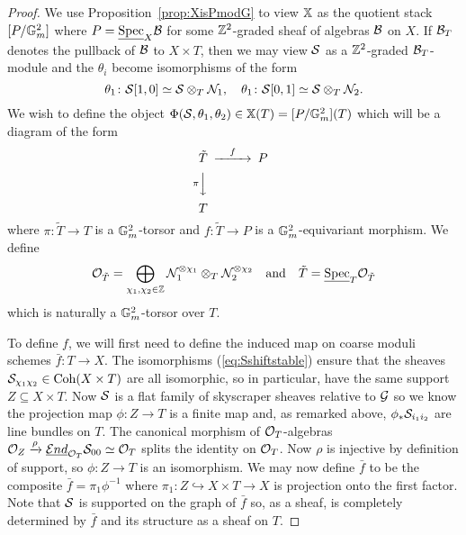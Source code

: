 \documentclass[12pt]{amsart}
\begin{document}
\begin{proof}
We use Proposition~\ref{prop:XisPmodG} to view $\mathbb{X}$ as the quotient stack $[P/\mathbb{G}_m^2]$ where $P = \underline{\operatorname{Spec}}_X \mathcal{B}$ for some $\mathbb{Z}^2$-graded sheaf of algebras $\mathcal{B}$ on $X$. 
If $\mathcal{B}_T$ denotes the pullback of $\mathcal{B}$ to $X \times T$, then we may view $\mathcal{S}$ as a $\mathbb{Z}^2$-graded $\mathcal{B}_T$-module and the $\theta_i$ become isomorphisms of the form 
\begin{equation}
\theta_1 \colon \mathcal{S}[1,0] \simeq \mathcal{S} \otimes_T \mathcal{N}_1, \quad 
\theta_1 \colon \mathcal{S}[0,1] \simeq \mathcal{S} \otimes_T \mathcal{N}_2.
\label{eq:Sshiftstable}
\end{equation}
We wish to define the object $\Phi(\mathcal{S}, \theta_1,\theta_2) \in \mathbb{X}(T) = [P/\mathbb{G}_m^2](T)$ which will be a diagram of the form
$$
\begin{CD}
\tilde{T} @>{f}>>  P \\
@V{\pi}VV @. \\
T @. 
\end{CD}
$$
where $\pi\colon \tilde{T} \to T$ is a $\mathbb{G}_m^2$-torsor and $f\colon \tilde{T} \to P$ is a $\mathbb{G}_m^2$-equivariant morphism. 
We define 
$$ \mathcal{O}_{\tilde{T}} = \bigoplus_{\chi_1,\chi_2 \in \mathbb{Z}} \mathcal{N}_1^{\otimes \chi_1} \otimes_T \mathcal{N}_2^{\otimes \chi_2} \quad \text{and} \quad  \tilde{T} = \underline{\operatorname{Spec}}_T \mathcal{O}_{\tilde{T}}$$
which is naturally a $\mathbb{G}_m^2$-torsor over $T$. 

To define $f$, we will first need to define the induced map on coarse moduli schemes $\bar{f} \colon T \to X$. The isomorphisms (\ref{eq:Sshiftstable}) ensure that the sheaves $\mathcal{S}_{\chi_1\chi_2} \in \operatorname{Coh}(X \times T)$ are all isomorphic, so in particular, have the same support $Z \subseteq X \times T$. Now $\mathcal{S}$ is a flat family of skyscraper sheaves relative to $\mathcal{G}$ so we know the projection map $\phi \colon Z \to T$ is a finite map and, as remarked above, $\phi_* \mathcal{S}_{i_1i_2}$ are line bundles on $T$. The canonical morphism of $\mathcal{O}_T$-algebras $\mathcal{O}_Z \xrightarrow{\rho} \underline{\mathop{{\mathcal{E}}nd}\nolimits}_{\mathcal{O}_T} \mathcal{S}_{00} \simeq \mathcal{O}_T$ splits the identity on $\mathcal{O}_T$. Now $\rho$ is injective by definition of support, so $\phi \colon Z \to T$ is an isomorphism. We may now define $\bar{f}$ to be the composite $\bar{f} = \pi_1 \phi^{-1}$ where $\pi_1 \colon Z \hookrightarrow X \times T \to X$ is projection onto the first factor. Note that $\mathcal{S}$ is supported on the graph of $\bar{f}$ so, as a sheaf, is completely determined by $\bar{f}$ and its structure as a sheaf on $T$. 


\end{proof}
\end{document}

